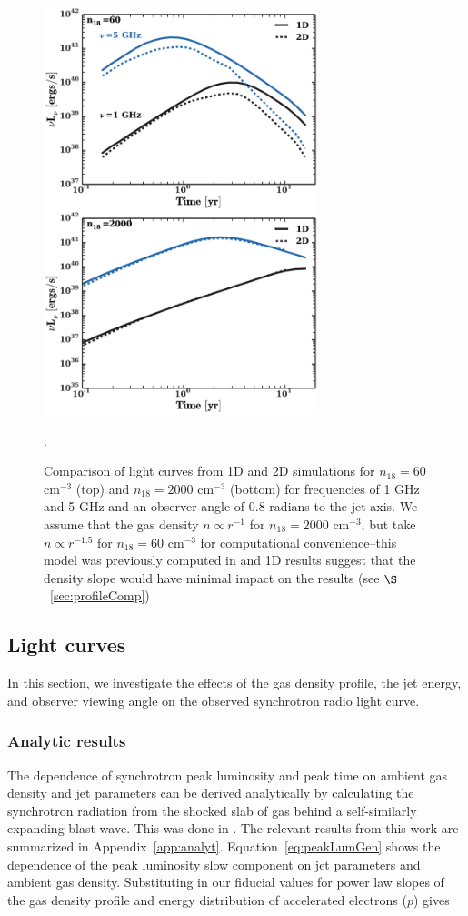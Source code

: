 \documentclass[usenatbib,fleqn]{mnras}
\begin{document}
\begin{figure}
\includegraphics[width=8cm]{1d_2d.pdf}
\caption{\label{fig:1D2DB} Comparison of light curves from 1D and 2D
  simulations for $n_{18}=60$ cm$^{-3}$ (top) and $n_{18}=2000$
  cm$^{-3}$ (bottom) for frequencies of 1 GHz and 5 GHz and an
  observer angle of 0.8 radians to the jet axis. We assume that the
  gas density $n\propto r^{-1}$ for $n_{18}=2000$ cm$^{-3}$, but take
  $n\propto r^{-1.5}$ for $n_{18}=60$ cm$^{-3}$ for computational
  convenience--this model was previously computed in
  \citet{Mimica+2015} and 1D results suggest that the density slope
  would have minimal impact on the results (see
  $\S$~\ref{sec:profileComp})}.
\end{figure}

\subsection{Light curves}
\label{sec:lightcurves}
In this section, we investigate the effects of the gas density
profile, the jet energy, and observer viewing angle on the observed
synchrotron radio light curve. 

\subsubsection{Analytic results}
The dependence of synchrotron peak luminosity and peak time on ambient
gas density and jet parameters can be derived analytically by
calculating the synchrotron radiation from the shocked slab of gas
behind a self-similarly expanding blast wave. This was done in
\citet{Leventis+2012}. The relevant results from this work are
summarized in Appendix~\ref{app:analyt}. Equation~\ref{eq:peakLumGen}
shows the dependence of the peak luminosity slow component on jet
parameters and ambient gas density. Substituting in our fiducial
values for power law slopes of the gas density profile and energy
distribution of accelerated electrons ($p$) gives
\end{document}
